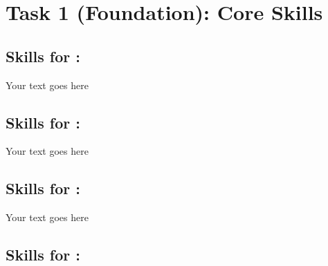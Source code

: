 \documentclass[a4paper, 11pt]{report}
\begin{document}
\newpage
\section{Task 1 (Foundation): Core Skills}
\subsection{Skills for \majA: \studA}

Your text goes here

\subsection{Skills for \majB: \studB}

Your text goes here

\subsection{Skills for \majC: \studC}

Your text goes here

\subsection{Skills for \majD: \studD}
\end{document}
